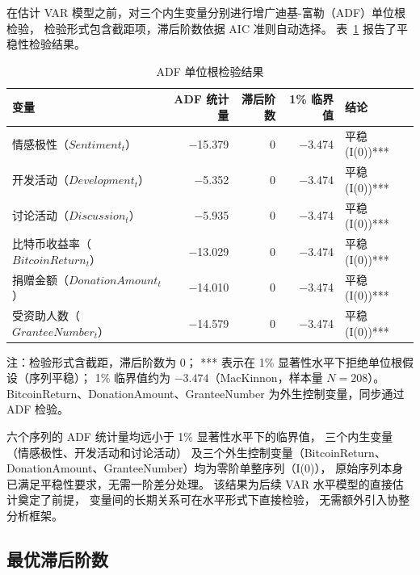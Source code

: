 \documentclass[
    type = master, %
    degree = professional,        %
    decl-page,  %
    twoside,                %
    fontset = fandol %
  ]{njuthesis}
\begin{document}
在估计 VAR 模型之前，对三个内生变量分别进行增广迪基-富勒（ADF）单位根检验，
检验形式包含截距项，滞后阶数依据 AIC 准则自动选择。
表~\ref{tab:adf-test} 报告了平稳性检验结果。

\begin{table}[htbp]
    \centering
    \small
    \caption{ADF 单位根检验结果}
    \label{tab:adf-test}
    \begin{tabularx}{\textwidth}{Xrrrp{3cm}}
        \toprule
        变量 & ADF 统计量 & 滞后阶数 & 1\% 临界值 & 结论 \\
        \midrule
        情感极性（$Sentiment_t$） & $-$15.379 & 0 & $-$3.474 & 平稳 (I(0))*** \\
        开发活动（$Development_t$）      & $-$5.352  & 0 & $-$3.474 & 平稳 (I(0))*** \\
        讨论活动（$Discussion_t$）   & $-$5.935  & 0 & $-$3.474 & 平稳 (I(0))*** \\
        比特币收益率（$BitcoinReturn_t$）    & $-$13.029 & 0 & $-$3.474 & 平稳 (I(0))*** \\
        捐赠金额（$DonationAmount_t$）  & $-$14.010 & 0 & $-$3.474 & 平稳 (I(0))*** \\
        受资助人数（$GranteeNumber_t$）     & $-$14.579 & 0 & $-$3.474 & 平稳 (I(0))*** \\
        \bottomrule
    \end{tabularx}
    \begin{minipage}{\textwidth}
        \vspace{0.3em}
        \footnotesize 注：检验形式含截距，滞后阶数为 0；
        *** 表示在 1\% 显著性水平下拒绝单位根假设（序列平稳）；
        1\% 临界值约为 $-3.474$（MacKinnon，样本量 $N = 208$）。
        BitcoinReturn、DonationAmount、GranteeNumber 为外生控制变量，同步通过 ADF 检验。
    \end{minipage}
\end{table}

六个序列的 ADF 统计量均远小于 1\% 显著性水平下的临界值，
三个内生变量（情感极性、开发活动和讨论活动）
及三个外生控制变量（BitcoinReturn、DonationAmount、GranteeNumber）均为零阶单整序列（I(0)），
原始序列本身已满足平稳性要求，无需一阶差分处理。
该结果为后续 VAR 水平模型的直接估计奠定了前提，
变量间的长期关系可在水平形式下直接检验，
无需额外引入协整分析框架。

\subsection{最优滞后阶数}
\end{document}
